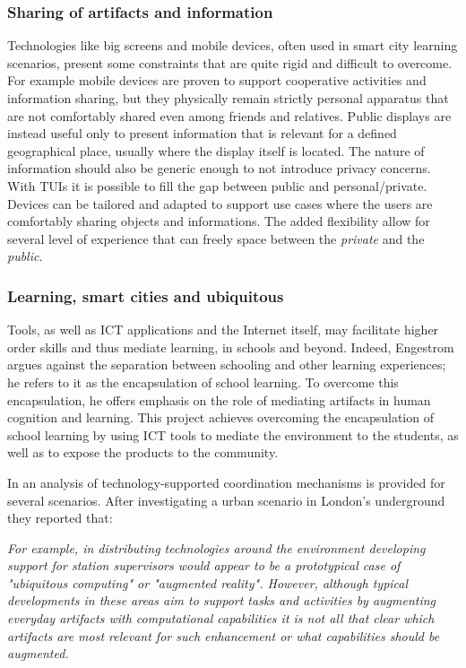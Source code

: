 \subsubsection{Sharing of artifacts and information}
Technologies like big screens and mobile devices, often used in smart city learning scenarios, present some constraints that are quite rigid and difficult to overcome. For example mobile devices are proven to support cooperative activities and information sharing, but they physically remain strictly personal apparatus that are not comfortably shared even among friends and relatives.
Public displays are instead useful only to present information that is relevant for a defined geographical place, usually where the display itself is located. The nature of information should also be generic enough to not introduce privacy concerns.
With TUIs it is possible to fill the gap between public and personal/private. Devices can be tailored and adapted to support use cases where the users are comfortably sharing objects and informations.
The added flexibility allow for several level of experience that can freely space between the \textit{private} and the \textit{public}.

\subsubsection{Learning, smart cities and ubiquitous}
Tools, as well as ICT applications and the Internet itself, may facilitate higher order skills and thus mediate learning, in schools and beyond\cite{kashtan_outdoors_2013}. Indeed, Engestrom\cite{engestrom_non_1991} argues against the separation between schooling and other learning experiences; he refers to it as the encapsulation of school learning. To overcome this encapsulation, he offers emphasis on the role of mediating artifacts in human cognition and learning.
This project achieves overcoming the encapsulation of school learning by using ICT tools to mediate the environment to the students, as well as to expose the products to the community\cite{kashtan_outdoors_2013}.

In \cite{luff_mobility_1998} an analysis of technology-supported coordination mechanisms is provided for several scenarios.
After investigating a urban scenario in London's underground they reported that:

\textit{For example, in distributing technologies around the environment developing support for station supervisors would appear to be a prototypical case of "ubiquitous computing" or
"augmented reality". However, although typical developments in these areas aim to support tasks and activities by augmenting everyday artifacts with computational capabilities it is not all that clear which artifacts are most relevant for such enhancement or what capabilities should be augmented.}

